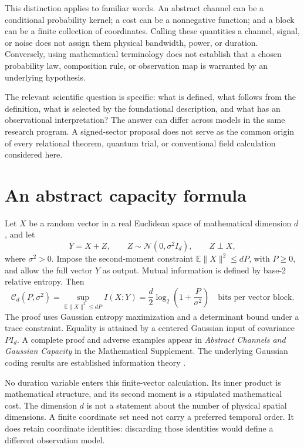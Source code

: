 \documentclass{article}
\begin{document}
This distinction applies to familiar words. An abstract channel can be a conditional probability kernel; a cost can be a nonnegative function; and a block can be a finite collection of coordinates. Calling these quantities a channel, signal, or noise does not assign them physical bandwidth, power, or duration. Conversely, using mathematical terminology does not establish that a chosen probability law, composition rule, or observation map is warranted by an underlying hypothesis.

The relevant scientific question is specific: what is defined, what follows from the definition, what is selected by the foundational description, and what has an observational interpretation? The answer can differ across models in the same research program. A signed-sector proposal does not serve as the common origin of every relational theorem, quantum trial, or conventional field calculation considered here.

\section{An abstract capacity formula}
Let \(X\) be a random vector in a real Euclidean space of mathematical dimension \(d\), and let
\[
Y=X+Z,\qquad Z\sim\mathcal N(0,\sigma^2 I_d),\qquad Z\perp X,
\]
where \(\sigma^2>0\). Impose the second-moment constraint \(\mathbb E\|X\|^2\le dP\), with \(P\ge0\), and allow the full vector \(Y\) as output. Mutual information is defined by base-2 relative entropy. Then
\[
\mathcal C_d(P,\sigma^2)
=\sup_{\mathbb E\|X\|^2\le dP} I(X;Y)
=\frac d2\log_2\!\left(1+\frac P{\sigma^2}\right)
\quad\text{bits per vector block}.
\]
The proof uses Gaussian entropy maximization and a determinant bound under a trace constraint. Equality is attained by a centered Gaussian input of covariance \(PI_d\). A complete proof and adverse examples appear in \emph{Abstract Channels and Gaussian Capacity} in the Mathematical Supplement. The underlying Gaussian coding results are established information theory \cite{shannon,polyanskiy17}.

No duration variable enters this finite-vector calculation. Its inner product is mathematical structure, and its second moment is a stipulated mathematical cost. The dimension \(d\) is not a statement about the number of physical spatial dimensions. A finite coordinate set need not carry a preferred temporal order. It does retain coordinate identities: discarding those identities would define a different observation model.
\end{document}
